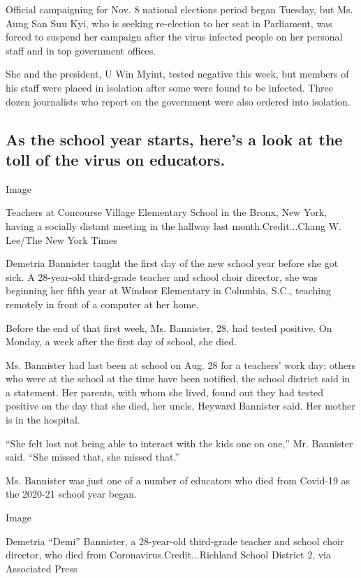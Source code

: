 Official campaigning for Nov. 8 national elections period began Tuesday,
but Ms. Aung San Suu Kyi, who is seeking re-election to her seat in
Parliament, was forced to suspend her campaign after the virus infected
people on her personal staff and in top government offices.

She and the president, U Win Myint, tested negative this week, but
members of his staff were placed in isolation after some were found to
be infected. Three dozen journalists who report on the government were
also ordered into isolation.

\hypertarget{as-the-school-year-starts-heres-a-look-at-the-toll-of-the-virus-on-educators}{%
\subsection{As the school year starts, here's a look at the toll of the
virus on
educators.}\label{as-the-school-year-starts-heres-a-look-at-the-toll-of-the-virus-on-educators}}

Image

Teachers at Concourse Village Elementary School in the Bronx, New York,
having a socially distant meeting in the hallway last
month.Credit...Chang W. Lee/The New York Times

Demetria Bannister taught the first day of the new school year before
she got sick. A 28-year-old third-grade teacher and school choir
director, she was beginning her fifth year at Windsor Elementary in
Columbia, S.C., teaching remotely in front of a computer at her home.

Before the end of that first week, Ms. Bannister, 28, had tested
positive. On Monday, a week after the first day of school, she died.

Ms. Bannister had last been at school on Aug. 28 for a teachers' work
day; others who were at the school at the time have been notified, the
school district said in a statement. Her parents, with whom she lived,
found out they had tested positive on the day that she died, her uncle,
Heyward Bannister said. Her mother is in the hospital.

``She felt lost not being able to interact with the kids one on one,''
Mr. Bannister said. ``She missed that, she missed that.''

Ms. Bannister was just one of a number of educators who died from
Covid-19 as the 2020-21 school year began.

Image

Demetria ``Demi'' Bannister, a 28-year-old third-grade teacher and
school choir director, who died from Coronavirus.Credit...Richland
School District 2, via Associated Press

